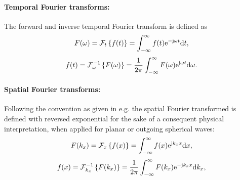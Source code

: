 \printnomenclature
%
\vspace{1cm}
\paragraph{Temporal Fourier transforms:}
The forward and inverse temporal Fourier transform is defined as 
\begin{equation}
\label{eq:temporal_fourier_transform_def}
F(\omega) = \mathcal{F}_t \left\{ f(t) \right\} = \int_ {-\infty}^{\infty} f(t) \mathrm{e}^{-\mathrm{j} \omega t} \mathrm{d} t,
\end{equation}
\begin{equation}
\label{eq:temporal_inverse_fourier_transform_def}
f(t) = \mathcal{F}_{\omega}^{-1} \left\{ F(\omega) \right\} = \frac{1}{2\pi} \int_ {-\infty}^{\infty} F(\omega) \mathrm{e}^{ \mathrm{j} \omega t} \mathrm{d} \omega.
\end{equation}
%
\paragraph{Spatial Fourier transforms:}
Following the convention as given in e.g. \cite{Williams1999} the spatial Fourier transformed is defined with reversed exponential for the sake of a consequent physical interpretation, when applied for planar or outgoing spherical waves:
\begin{equation}
\label{eq:spatial_fourier_transform_def}
F(k_x) = \mathcal{F}_x \left\{ f(x) \right\} = \int_ {-\infty}^{\infty} f(x) \mathrm{e}^{\mathrm{j} k_x x} \mathrm{d} x,
\end{equation}
\begin{equation}
\label{eq:spatial_inverse_fourier_transform_def}
f(x) = \mathcal{F}_{k_x}^{-1} \left\{ F(k_x) \right\} = \frac{1}{2\pi} \int_ {-\infty}^{\infty} F(k_x) \mathrm{e}^{ -\mathrm{j} k_x x} \mathrm{d} k_x,
\end{equation}


%

